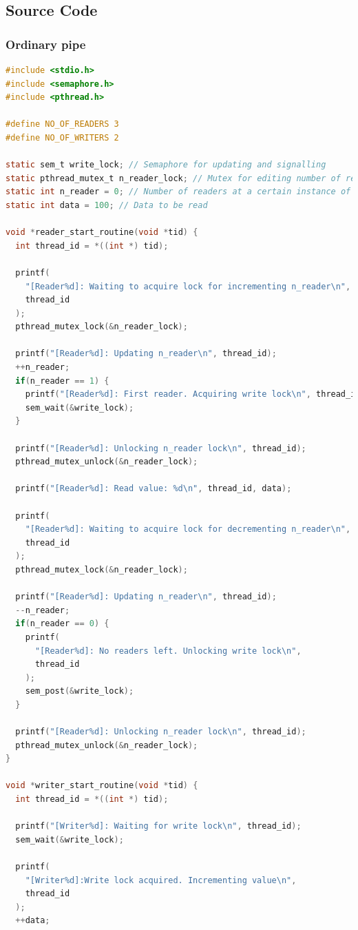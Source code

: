 \subsection{Source Code}
\subsubsection{Ordinary pipe}
\begin{lstlisting}[language=C]
#include <stdio.h>
#include <semaphore.h>
#include <pthread.h>

#define NO_OF_READERS 3
#define NO_OF_WRITERS 2

static sem_t write_lock; // Semaphore for updating and signalling
static pthread_mutex_t n_reader_lock; // Mutex for editing number of readers
static int n_reader = 0; // Number of readers at a certain instance of time
static int data = 100; // Data to be read

void *reader_start_routine(void *tid) {
  int thread_id = *((int *) tid);

  printf(
    "[Reader%d]: Waiting to acquire lock for incrementing n_reader\n", 
    thread_id
  );
  pthread_mutex_lock(&n_reader_lock);

  printf("[Reader%d]: Updating n_reader\n", thread_id);
  ++n_reader;
  if(n_reader == 1) {
    printf("[Reader%d]: First reader. Acquiring write lock\n", thread_id);
    sem_wait(&write_lock);
  }

  printf("[Reader%d]: Unlocking n_reader lock\n", thread_id);
  pthread_mutex_unlock(&n_reader_lock);

  printf("[Reader%d]: Read value: %d\n", thread_id, data);

  printf(
    "[Reader%d]: Waiting to acquire lock for decrementing n_reader\n", 
    thread_id
  );
  pthread_mutex_lock(&n_reader_lock);

  printf("[Reader%d]: Updating n_reader\n", thread_id);
  --n_reader;
  if(n_reader == 0) {
    printf(
      "[Reader%d]: No readers left. Unlocking write lock\n", 
      thread_id
    );
    sem_post(&write_lock);
  }

  printf("[Reader%d]: Unlocking n_reader lock\n", thread_id);
  pthread_mutex_unlock(&n_reader_lock);
}

void *writer_start_routine(void *tid) {
  int thread_id = *((int *) tid);

  printf("[Writer%d]: Waiting for write lock\n", thread_id);
  sem_wait(&write_lock);

  printf(
    "[Writer%d]:Write lock acquired. Incrementing value\n",
    thread_id
  );
  ++data;


\end{lstlisting}

